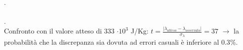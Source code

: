 \documentclass[a4paper]{article}
\theoremstyle{definition}
\begin{document}
.\\\\
.\\
Confronto con il valore atteso di 333 \( \cdot 10^{3}\) J/Kg: \(t = \frac{\left | \lambda_{atteso} - \lambda_{osservato}\right |}{\sigma_{\lambda}} = 37\) \(\rightarrow\) la probabilità che la discrepanza sia dovuta ad errori casuali è inferiore al \(0.3 \%\).
\end{document}
